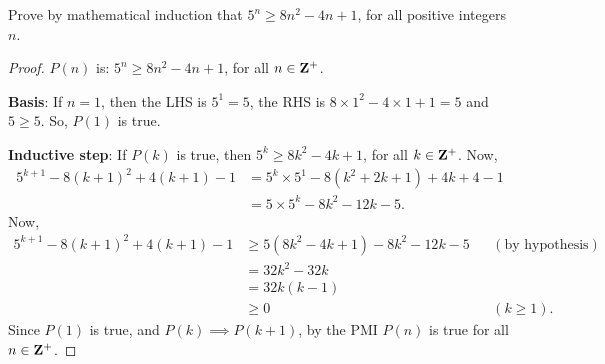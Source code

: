 \question[5] %
Prove by mathematical induction that $5^n \geq 8n^2 - 4n + 1$, for all positive integers $n$.

\begin{EnvFullwidth}
\begin{solutionorgrid}[6in]
\begin{proof}
$P(n)$ is: $5^n \geq 8n^2 - 4n + 1$, for all $n \in \mathbf{Z}^+$.

\textbf{Basis}: If $n = 1$, then the LHS is $5^1 = 5$, the RHS is $8 \times 1^2 - 4 \times 1 + 1 = 5$ and $5 \geq 5$. So, $P(1)$ is true.

\textbf{Inductive step}: If $P(k)$ is true, then $5^k \geq 8k^2 - 4k + 1$, for all $k \in \mathbf{Z}^+$. Now,
\begin{align*}
	5^{k + 1} - 8(k + 1)^2 + 4(k + 1) - 1 &= 5^k \times 5^1 - 8(k^2 + 2k + 1) + 4k + 4 - 1 \\
	&= 5 \times 5^k - 8k^2 - 12k - 5.
\end{align*}
Now,
\begin{align*}
	5^{k + 1} - 8(k + 1)^2 + 4(k + 1) - 1 &\geq 5(8k^2 - 4k + 1) - 8k^2 - 12k - 5 && (\textrm{by hypothesis}) \\
	&= 32k^2 - 32k \\
	&= 32k(k - 1) \\
	&\geq 0 && (k \geq 1).
\end{align*}
Since $P(1)$ is true, and $P(k) \implies P(k + 1)$, by the PMI $P(n)$ is true for all $n \in \mathbf{Z}^+$.
\end{proof}
\end{solutionorgrid}
\end{EnvFullwidth}

